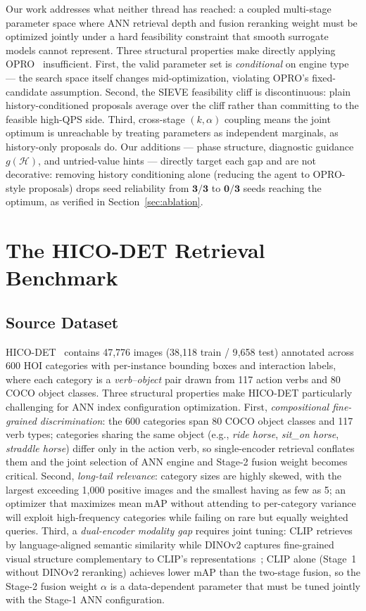 \documentclass[sigconf, nonacm]{acmart}
\theoremstyle{definition}
\begin{document}
Our work addresses what neither thread has reached: a coupled multi-stage parameter
space where ANN retrieval depth and fusion reranking weight must be optimized jointly
under a hard feasibility constraint that smooth surrogate models cannot represent.
Three structural properties make directly applying OPRO~\cite{yang2024opro} insufficient.
First, the valid parameter set is \emph{conditional} on engine type --- the search space
itself changes mid-optimization, violating OPRO's fixed-candidate assumption.
Second, the SIEVE feasibility cliff is discontinuous: plain history-conditioned proposals
average over the cliff rather than committing to the feasible high-QPS side.
Third, cross-stage $(k,\alpha)$ coupling means the joint optimum is unreachable by
treating parameters as independent marginals, as history-only proposals do.
Our additions --- phase structure, diagnostic guidance $g(\mathcal{H})$, and
untried-value hints --- directly target each gap and are not decorative:
removing history conditioning alone (reducing the agent to OPRO-style proposals)
drops seed reliability from $\mathbf{3/3}$ to $\mathbf{0/3}$ seeds reaching the
optimum, as verified in Section~\ref{sec:ablation}.

\section{The HICO-DET Retrieval Benchmark}
\label{sec:benchmark}

\subsection{Source Dataset}
HICO-DET~\cite{chao2018hico} contains 47{,}776 images (38{,}118 train / 9{,}658 test)
annotated across 600 HOI categories with per-instance bounding boxes and interaction
labels, where each category is a \emph{verb--object} pair drawn from 117 action verbs
and 80 COCO object classes.
Three structural properties make HICO-DET particularly challenging for ANN index
configuration optimization.
First, \emph{compositional fine-grained discrimination}: the 600 categories span
80 COCO object classes and 117 verb types; categories sharing the same object
(e.g., \textit{ride horse}, \textit{sit\_on horse}, \textit{straddle horse})
differ only in the action verb, so single-encoder retrieval conflates them and
the joint selection of ANN engine and Stage-2 fusion weight becomes critical.
Second, \emph{long-tail relevance}: category sizes are highly skewed, with the
largest exceeding 1{,}000 positive images and the smallest having as few as 5;
an optimizer that maximizes mean mAP without attending to per-category variance
will exploit high-frequency categories while failing on rare but equally weighted
queries.
Third, a \emph{dual-encoder modality gap} requires joint tuning: CLIP retrieves
by language-aligned semantic similarity while DINOv2 captures fine-grained visual
structure complementary to CLIP's representations~\cite{oquab2024dinov2}; CLIP
alone (Stage~1 without DINOv2 reranking) achieves lower mAP than the two-stage
fusion, so the Stage-2 fusion weight $\alpha$ is a data-dependent parameter that
must be tuned jointly with the Stage-1 ANN configuration.
\end{document}
